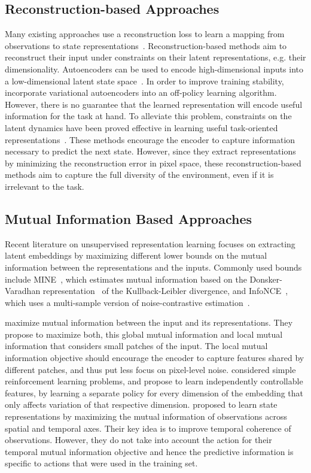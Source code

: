\documentclass[a4paper,12pt]{article}
\begin{document}
\subsection{Reconstruction-based Approaches}
Many existing approaches use a reconstruction loss to learn a mapping from observations to state representations~\cite{mattner2012learn, finn2016deep}. Reconstruction-based methods aim to reconstruct their input under constraints on their latent representations, e.g. their dimensionality. Autoencoders can be used to encode high-dimensional inputs into a low-dimensional latent state space~\cite{mattner2012learn}. In order to improve training stability, \citet{yarats2019improving} incorporate variational autoencoders into an off-policy learning algorithm. However, there is no guarantee that the learned representation will encode useful information for the task at hand. To alleviate this problem, constraints on the latent dynamics have been proved effective in learning useful task-oriented representations~\cite{watter2015embed, van2016stable, finn2016unsupervised}. These methods encourage the encoder to capture information necessary to predict the next state. However, since they extract representations by minimizing the reconstruction error in pixel space, these reconstruction-based methods aim to capture the full diversity of the environment, even if it is irrelevant to the task.

\subsection{Mutual Information Based Approaches}
Recent literature on unsupervised representation learning focuses on extracting latent embeddings by maximizing different lower bounds on the mutual information between the representations and the inputs. Commonly used bounds include MINE~\cite{belghazi2018mine}, which estimates mutual information based on the Donsker-Varadhan representation~\cite{donsker1975asymptotic} of the Kullback-Leibler divergence, and InfoNCE~\cite{oord2018}, which uses a multi-sample version of noise-contrastive estimation~\cite{gutmann2010noise}.

\citet{hjelm2018learning} maximize mutual information between the input and its representations. They propose to maximize both, this global mutual information and local mutual information that considers small patches of the input. The local mutual information objective should encourage the encoder to capture features shared by different patches, and thus put less focus on pixel-level noise. 
\citet{bengio2017independently} considered simple reinforcement learning problems, and propose to learn independently controllable features, by learning a separate policy for every dimension of the embedding that only affects variation of that respective dimension.
\citet{anand2019unsupervised} proposed to learn state representations by maximizing the mutual information of observations across spatial and temporal axes. Their key idea is to improve temporal coherence of observations. However, they do not take into account the action for their temporal mutual information objective and hence the predictive information is specific to actions that were used in the training set.  
\end{document}
